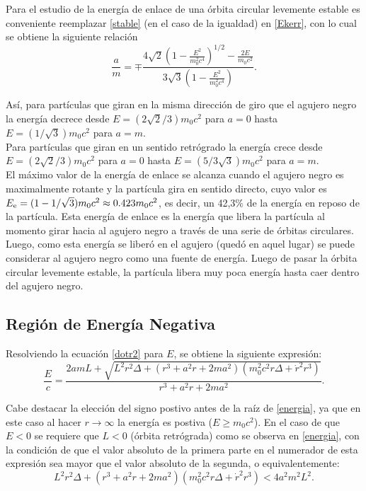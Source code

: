 Para el estudio de la energ\'ia de enlace de una \'orbita circular levemente estable es conveniente reemplazar  \eqref{stable} (en el caso de la igualdad) en \eqref{Ekerr}, con lo cual se obtiene la siguiente relaci\'on
\begin{equation}
\frac{a}{m}=\mp\frac{4\sqrt{2}\left(1-\frac{E^2}{m_0^2c^4} \right)^{1/2}-\frac{2E}{m_0c^2}}{3\sqrt{3}\left(1-\frac{E^2}{m_0^2c^4} \right)}.
\end{equation}

As\'i, para part\'iculas que giran en la misma direcci\'on de giro que el agujero negro la energ\'ia decrece desde $E=(2\sqrt{2}/3)m_0c^2$ para $a=0$ hasta $E=(1/\sqrt{3})m_0c^2$ para $a=m$.\\

Para part\'iculas que giran en un sentido retr\'ogrado la energ\'ia crece desde $E=(2\sqrt{2}/3)m_0c^2$ para $a=0$ hasta $E=(5/3\sqrt{3})m_0c^2$ para $a=m$.\\

El m\'aximo valor de la energ\'ia de enlace se alcanza cuando el agujero negro es maximalmente rotante y la part\'icula gira en sentido directo, cuyo valor es $E_{\rm e}=(1-1/\sqrt{3})m_0c^2 \approx 0.423 m_0c^2$, es decir, un 42,3$\%$ de la energ\'ia en reposo de la part\'icula. Esta energ\'ia de enlace es la energ\'ia que libera la part\'icula al momento girar hacia al agujero negro a trav\'es de una serie de \'orbitas circulares. Luego, como esta energ\'ia se liber\'o en el agujero (qued\'o en aquel lugar) se puede considerar al agujero negro como una fuente de energ\'ia. Luego de pasar la \'orbita circular levemente estable, la part\'icula libera muy poca energ\'ia hasta caer dentro del agujero negro.\\

\subsection{Regi\'on de Energ\'ia Negativa}

Resolviendo la ecuaci\'on \eqref{dotr2} para $E$, se obtiene la siguiente expresi\'on:
\begin{equation}\label{energia}
\frac{E}{c}=\frac{2amL+\sqrt{L^2r^2\Delta+\left(r^3+a^2r+2ma^2\right)\left(m_0^2c^2r\Delta+\dot{r}^2r^3\right)}}{r^3+a^2r+2ma^2}.
\end{equation}

Cabe destacar la elecci\'on del signo postivo antes de la ra\'iz de \eqref{energia}, ya que en este caso al hacer $r\rightarrow \infty$ la energ\'ia es postiva ($E \geq m_0c^2$). En el caso de que $E<0$ se requiere que $L<0$ (\'orbita retr\'ograda) como se observa en \eqref{energia}, con la condici\'on de que el valor absoluto de la primera parte en el numerador de esta expresi\'on sea mayor que el valor absoluto de la segunda, o equivalentemente:
\begin{equation}\label{desigualdad}
L^2r^2\Delta+\left(r^3+a^2r+2ma^2\right)\left(m_0^2c^2r\Delta+\dot{r}^2r^3\right) < 4a^2m^2L^2.
\end{equation}

